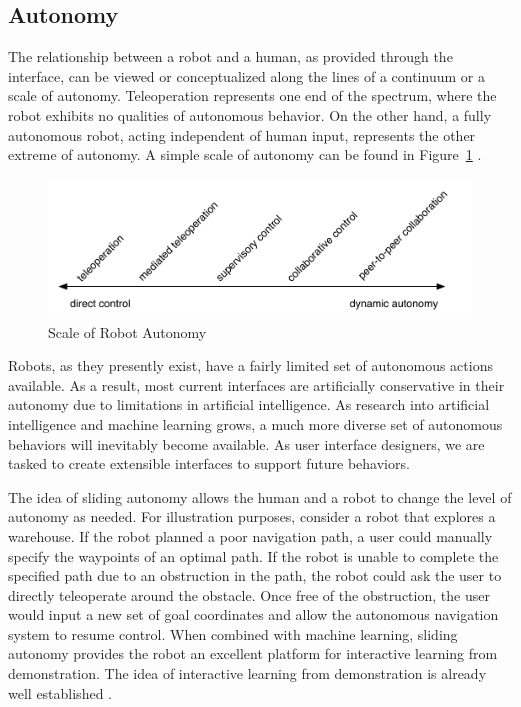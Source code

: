 \subsection{Autonomy}
\label{sub:autonomy}

The relationship between a robot and a human, as provided through the interface, can be viewed or conceptualized along the lines of a continuum or a scale of autonomy. Teleoperation represents one end of the spectrum, where the robot exhibits no qualities of autonomous behavior. On the other hand, a fully autonomous robot, acting independent of human input, represents the other extreme of autonomy. A simple scale of autonomy can be found in Figure~\ref{fig:autonomy} \cite{Goodrich_Survey}.


\begin{figure}[ht]
\begin{center}
\includegraphics[width=5in]{images/autonomy.pdf}
\caption{Scale of Robot Autonomy\label{fig:autonomy}}
\end{center}
\end{figure}

Robots, as they presently exist, have a fairly limited set of autonomous actions available. As a result, most current interfaces are artificially conservative in their autonomy due to limitations in artificial intelligence. As research into artificial intelligence and machine learning grows, a much more diverse set of autonomous behaviors will inevitably become available. As user interface designers, we are tasked to create extensible interfaces to support future behaviors.

The idea of sliding autonomy allows the human and a robot to change the level of autonomy as needed. For illustration purposes, consider a robot that explores a warehouse. If the robot planned a poor navigation path, a user could manually specify the waypoints of an optimal path. If the robot is unable to complete the specified path due to an obstruction in the path, the robot could ask the user to directly teleoperate around the obstacle. Once free of the obstruction, the user would input a new set of goal coordinates and allow the autonomous navigation system to resume control. When combined with machine learning, sliding autonomy provides the robot an excellent platform for interactive learning from demonstration. The idea of interactive learning from demonstration is already well established \cite{GWAP} \cite{Grollman}.


